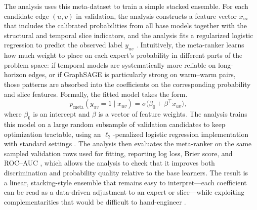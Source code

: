 The analysis uses this meta-dataset to train a simple stacked ensemble. For each candidate edge \((u,v)\) in validation, the analysis constructs a feature vector \(x_{uv}\) that includes the calibrated probabilities from all base models together with the structural and temporal slice indicators, and the analysis fits a regularized logistic regression to predict the observed label \(y_{uv}\) \parencite{wolpert_stacked_1992,dietterich_ensemble_2000,hosmer_jr_applied_2013}. Intuitively, the meta-ranker learns how much weight to place on each expert's probability in different parts of the problem space: if temporal models are systematically more reliable on long-horizon edges, or if GraphSAGE is particularly strong on warm--warm pairs, those patterns are absorbed into the coefficients on the corresponding probability and slice features. Formally, the fitted model takes the form.
\[
p_{\text{meta}}(y_{uv}=1 \mid x_{uv}) = \sigma\big(\beta_0 + \beta^\top x_{uv}\big),
\]
where \(\beta_0\) is an intercept and \(\beta\) is a vector of feature weights. The analysis trains this model on a large random subsample of validation candidates to keep optimization tractable, using an \(\ell_2\)-penalized logistic regression implementation with standard settings \parencite{pedregosa_scikit-learn_2011}. The analysis then evaluates the meta-ranker on the same sampled validation rows used for fitting, reporting log loss, Brier score, and ROC--AUC \parencite{brier_verification_1950,bradley_use_1997}, which allows the analysis to check that it improves both discrimination and probability quality relative to the base learners. The result is a linear, stacking-style ensemble that remains easy to interpret---each coefficient can be read as a data-driven adjustment to an expert or slice---while exploiting complementarities that would be difficult to hand-engineer \parencite{niculescu-mizil_predicting_2005}.

